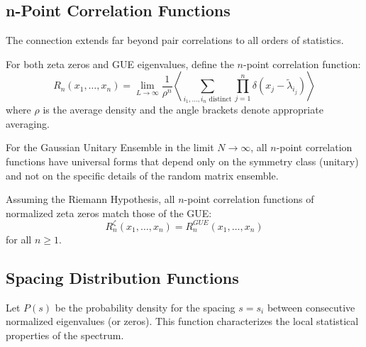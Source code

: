 \subsection{n-Point Correlation Functions}

The connection extends far beyond pair correlations to all orders of statistics.

\begin{definition}
\label{def:n_point_correlation}
For both zeta zeros and GUE eigenvalues, define the $n$-point correlation function:
\begin{equation}
R_n(x_1, \ldots, x_n) = \lim_{L \to \infty} \frac{1}{\rho^n} \left\langle \sum_{i_1, \ldots, i_n \text{ distinct}} \prod_{j=1}^n \delta(x_j - \tilde{\lambda}_{i_j}) \right\rangle
\end{equation}
where $\rho$ is the average density and the angle brackets denote appropriate averaging.
\end{definition}

\begin{theorem}
\label{thm:gue_universality}
For the Gaussian Unitary Ensemble in the limit $N \to \infty$, all $n$-point correlation functions have universal forms that depend only on the symmetry class (unitary) and not on the specific details of the random matrix ensemble.
\end{theorem}

\begin{conjecture}
\label{conj:zeta_gue}
Assuming the Riemann Hypothesis, all $n$-point correlation functions of normalized zeta zeros match those of the GUE:
\begin{equation}
R_n^{\zeta}(x_1, \ldots, x_n) = R_n^{GUE}(x_1, \ldots, x_n)
\end{equation}
for all $n \geq 1$.
\end{conjecture}

\subsection{Spacing Distribution Functions}

\begin{definition}
\label{def:spacing_distribution}
Let $P(s)$ be the probability density for the spacing $s = s_i$ between consecutive normalized eigenvalues (or zeros). This function characterizes the local statistical properties of the spectrum.
\end{definition}

